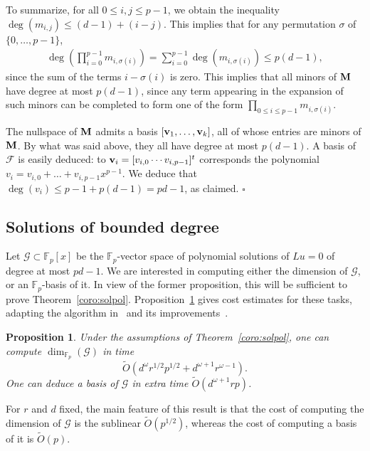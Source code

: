 \documentclass{sig-alternate}
\newcommand{\bigOsoft}{\tilde{O}}
\def\F {\mathbb{F}}
\def\mv {\ensuremath{{\bf v}}}
\def\mM {\ensuremath{{\bf M}}}
\def\foorp{\hfill$\square$}
\newtheorem{Prop}{Proposition}
\begin{document}
To summarize, for all $0 \le i,j \le p-1$, we obtain the inequality
$\deg(m_{i,j}) \le (d-1) + (i-j)$. This implies that for 
any permutation $\sigma$ of $\{0,\dots,p-1\}$, 
$$
\begin{array}{c}
  \deg (\prod_{i=0}^{p-1} m_{i,\sigma(i)})
  =\sum_{i=0}^{p-1} \deg(m_{i,\sigma(i)})
  \le p(d-1),\end{array}$$
since the sum of the terms $i-\sigma(i)$ is zero. This implies
that all minors of $\mM$ have degree at most $p(d-1)$, since
any term appearing in the expansion of such minors can be completed
to form one of the form $\prod_{0 \le i \le p-1} m_{i,\sigma(i)}$.

The nullspace of $\mM$ admits a basis $[\mv_1,\dots,\mv_k]$, all of whose 
entries are minors of $\mM$. By what was said above, they all have
degree at most $p(d-1)$. A basis of $\mathcal{F}$ is easily deduced:
to $\mv_i=[v_{i,0}\cdots v_{i,p-1}]^t$ corresponds the polynomial
$v_i = v_{i,0} + \dots + v_{i,p-1}x^{p-1}$. We deduce that
$\deg(v_i) \le p-1+p(d-1)=pd-1$, as claimed. \foorp



\subsection{Solutions of bounded degree}
 
\noindent Let $\mathcal{G}\subset\F_p[x]$ be the $\F_p$-vector space
of polynomial solutions of $Lu=0$ of degree at most $pd-1$. We are
interested in computing either the dimension of $\mathcal{G}$, or an
$\F_p$-basis of it. In view of the former proposition, this will be
sufficient to prove
Theorem~\ref{coro:solpol}. Proposition~\ref{theo:solpol} gives cost
estimates for these tasks, adapting the algorithm in~\cite{AbBrPe95}
and its improvements~\cite{BoClSa05}.
\begin{Prop}\label{theo:solpol}
  Under the assumptions of Theorem~\ref{coro:solpol}, one can compute
  $\dim_{\F_p}(\mathcal{G})$ in time
  $$\bigOsoft(d^\omega r^{1/2} p^{1/2}+ d^{\omega+1}r^{\omega-1}).$$
One can deduce a basis of $\mathcal{G}$ in extra time
$\bigOsoft(d^{\omega+1}rp)$.
\end{Prop}
For $r$ and $d$ fixed, the main feature of this result is that the
cost of computing the dimension of $\mathcal{G}$ is the sublinear
$\bigOsoft(p^{1/2})$, whereas the cost of computing a basis of it is
$\bigOsoft(p)$.
\end{document}
